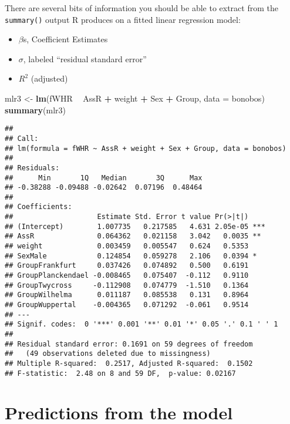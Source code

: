 \documentclass[]{book}
\newenvironment{Shaded}{\begin{snugshade}}{\end{snugshade}}
\newcommand{\DataTypeTok}[1]{\textcolor[rgb]{0.13,0.29,0.53}{#1}}
\newcommand{\KeywordTok}[1]{\textcolor[rgb]{0.13,0.29,0.53}{\textbf{#1}}}
\newcommand{\NormalTok}[1]{#1}
\newcommand{\OperatorTok}[1]{\textcolor[rgb]{0.81,0.36,0.00}{\textbf{#1}}}
\newcommand{\StringTok}[1]{\textcolor[rgb]{0.31,0.60,0.02}{#1}}
\begin{document}
There are several bits of information you should be able to extract from the \texttt{summary()} output R produces on a fitted linear regression model:

\begin{itemize}
\item
  \(\beta\)s, Coefficient Estimates
\item
  \(\sigma\), labeled ``residual standard error''
\item
  \(R^2\) (adjusted)
\end{itemize}

\begin{Shaded}
\begin{Highlighting}[]
\NormalTok{mlr3 <-}\StringTok{ }\KeywordTok{lm}\NormalTok{(fWHR }\OperatorTok{~}\StringTok{ }\NormalTok{AssR }\OperatorTok{+}\StringTok{ }\NormalTok{weight }\OperatorTok{+}\StringTok{ }\NormalTok{Sex }\OperatorTok{+}\StringTok{ }\NormalTok{Group, }\DataTypeTok{data =}\NormalTok{ bonobos)}
\KeywordTok{summary}\NormalTok{(mlr3)}
\end{Highlighting}
\end{Shaded}

\begin{verbatim}
## 
## Call:
## lm(formula = fWHR ~ AssR + weight + Sex + Group, data = bonobos)
## 
## Residuals:
##      Min       1Q   Median       3Q      Max 
## -0.38288 -0.09488 -0.02642  0.07196  0.48464 
## 
## Coefficients:
##                    Estimate Std. Error t value Pr(>|t|)    
## (Intercept)        1.007735   0.217585   4.631 2.05e-05 ***
## AssR               0.064362   0.021158   3.042   0.0035 ** 
## weight             0.003459   0.005547   0.624   0.5353    
## SexMale            0.124854   0.059278   2.106   0.0394 *  
## GroupFrankfurt     0.037426   0.074892   0.500   0.6191    
## GroupPlanckendael -0.008465   0.075407  -0.112   0.9110    
## GroupTwycross     -0.112908   0.074779  -1.510   0.1364    
## GroupWilhelma      0.011187   0.085538   0.131   0.8964    
## GroupWuppertal    -0.004365   0.071292  -0.061   0.9514    
## ---
## Signif. codes:  0 '***' 0.001 '**' 0.01 '*' 0.05 '.' 0.1 ' ' 1
## 
## Residual standard error: 0.1691 on 59 degrees of freedom
##   (49 observations deleted due to missingness)
## Multiple R-squared:  0.2517, Adjusted R-squared:  0.1502 
## F-statistic:  2.48 on 8 and 59 DF,  p-value: 0.02167
\end{verbatim}

\hypertarget{predictions-from-the-model}{%
\section{Predictions from the model}\label{predictions-from-the-model}}
\end{document}
